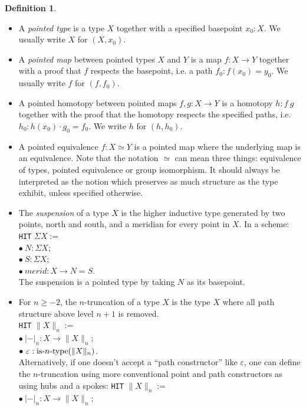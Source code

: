 \documentclass{article}
\newcommand{\istrunc}[1]{\textnormal{is-}#1\textnormal{-type}}
\newcommand{\eps}{\ensuremath{\varepsilon}}
\theoremstyle{definition}
\newtheorem{definition}[theorem]{Definition}
\theoremstyle{remark}
\begin{document}
\begin{definition}
\mbox{}
\begin{itemize}
  \item A \emph{pointed type} is a type $X$ together with a specified basepoint $x_0 : X$. We
    usually write $X$ for $(X,x_0)$.
  \item A \emph{pointed map} between pointed types $X$ and $Y$ is a map $f : X \to Y$ together with
    a proof that $f$ respects the basepoint, i.e. a path $f_0 : f(x_0) = y_0$. We usually write $f$
    for $(f,f_0)$.
  \item A pointed homotopy between pointed maps $f, g : X \to Y$ is a homotopy $h : f ~ g$ together
    with the proof that the homotopy respects the specified paths, i.e. $h_0 : h(x_0) \cdot g_0 =
    f_0$. We write $h$ for $(h,h_0)$.
  \item A pointed equivalence $f : X \simeq Y$ is a pointed map where the underlying map is an
    equivalence. Note that the notation $\simeq$ can mean three things: equivalence of types,
    pointed equivalence or group isomorphism. It should always be interpreted as the notion which
    preserves as much structure as the type exhibit, unless specified otherwise.
  \item The \emph{suspension} of a type $X$ is the higher inductive type generated by two points,
    north and south, and a meridian for every point in $X$. In a scheme: \\
    \texttt{HIT} $\Sigma X :=$ \\
    $\bullet\ N : \Sigma X$; \\
    $\bullet\ S : \Sigma X$; \\
    $\bullet\ merid : X \to N = S$. \\
    The suspension is a pointed type by taking $N$ as its basepoint.
  \item For $n\geq -2$, the $n$-truncation of a type $X$ is the type $X$ where all path structure
    above level $n+1$ is removed. \\
    \texttt{HIT} $\|X\|_n :=$ \\
    $\bullet\ |{-}|_n : X \to \|X\|_n$; \\
    $\bullet\ \eps : \istrunc{n}(\|X\|_n)$. \\
    Alternatively, if one doesn't accept a ``path constructor'' like $\eps$, one can define the $n$-truncation using more conventional point and path constructors as using hubs and a spokes:
    \texttt{HIT} $\|X\|_n :=$ \\
    $\bullet\ |{-}|_n : X \to \|X\|_n$; \\

\end{itemize}
\end{definition}
\end{document}
